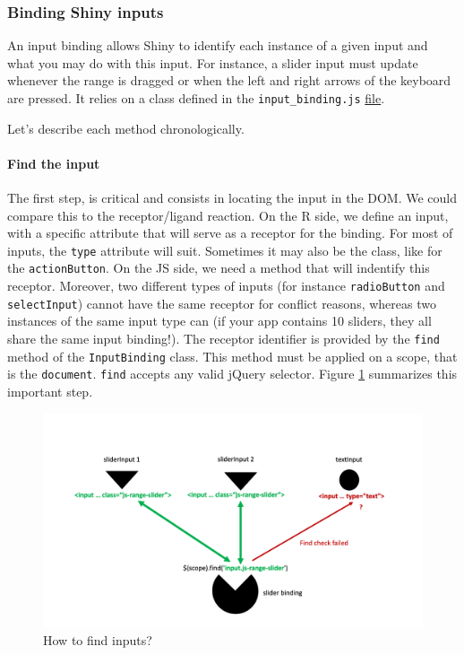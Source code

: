 \documentclass[]{book}
\let\oldparagraph\paragraph
\renewcommand{\paragraph}[1]{\oldparagraph{#1}\mbox{}}
\begin{document}
\hypertarget{binding-shiny-inputs}{%
\subsubsection{Binding Shiny inputs}\label{binding-shiny-inputs}}

An input binding allows Shiny to identify each instance of a given input and what you may do with this input. For instance, a slider input must update whenever the range is dragged or when the left and right arrows of the keyboard are pressed. It relies on a class defined in the \texttt{input\_binding.js} \href{https://github.com/rstudio/shiny/blob/master/srcjs/input_binding.js}{file}.

Let's describe each method chronologically.

\hypertarget{find-the-input}{%
\paragraph{Find the input}\label{find-the-input}}

The first step, is critical and consists in locating the input in the DOM. We could compare this to the receptor/ligand reaction.
On the R side, we define an input, with a specific attribute that will serve as a receptor for the binding. For most of inputs, the \texttt{type} attribute will suit. Sometimes it may also be the class, like for the \texttt{actionButton}. On the JS side, we need a method that will indentify this receptor. Moreover, two different types of inputs (for instance \texttt{radioButton} and \texttt{selectInput}) cannot have the same receptor for conflict reasons, whereas two instances of the same input type can (if your app contains 10 sliders, they all share the same input binding!). The receptor identifier is provided by the \texttt{find} method of the \texttt{InputBinding} class. This method must be applied on a scope, that is the \texttt{document}. \texttt{find} accepts any valid jQuery selector. Figure \ref{fig:shiny-find-inputs} summarizes this important step.

\begin{figure}
\includegraphics[width=20in]{images/survival-kit/shiny-find-inputs} \caption{How to find inputs?}\label{fig:shiny-find-inputs}
\end{figure}
\end{document}

